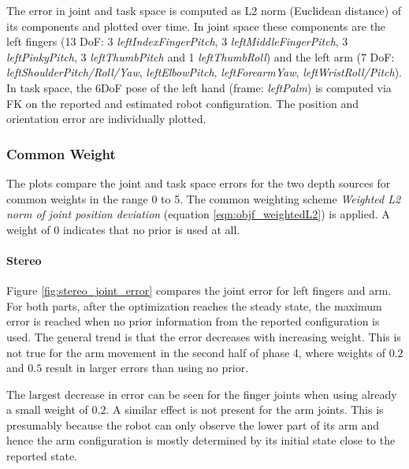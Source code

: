 The error in joint and task space is computed as L2 norm (Euclidean distance) of its components and plotted over time. In joint space these components are the left fingers (13 DoF: 3 \emph{leftIndexFingerPitch}, 3 \emph{leftMiddleFingerPitch}, 3 \emph{leftPinkyPitch}, 3 \emph{leftThumbPitch} and 1 \emph{leftThumbRoll}) and the left arm (7 DoF: \emph{leftShoulderPitch/Roll/Yaw}, \emph{leftElbowPitch}, \emph{leftForearmYaw}, \emph{leftWristRoll/Pitch}). In task space, the 6DoF pose of the left hand (frame: \emph{leftPalm}) is computed via FK on the reported and estimated robot configuration. The position and orientation error are individually plotted.

\subsubsection{Common Weight}

The plots compare the joint and task space errors for the two depth sources for common weights in the range 0 to 5. The common weighting scheme \emph{Weighted L2 norm of joint position deviation} (equation \ref{eqn:objf_weightedL2}) is applied. A weight of 0 indicates that no prior is used at all.

\paragraph{Stereo}

Figure \ref{fig:stereo_joint_error} compares the joint error for left fingers and arm. For both parts, after the optimization reaches the steady state, the maximum error is reached when no prior information from the reported configuration is used.
The general trend is that the error decreases with increasing weight. This is not true for the arm movement in the second half of phase 4, where weights of $0.2$ and $0.5$ result in larger errors than using no prior.

The largest decrease in error can be seen for the finger joints when using already a small weight of $0.2$. A similar effect is not present for the arm joints. This is presumably because the robot can only observe the lower part of its arm and hence the arm configuration is mostly determined by its initial state close to the reported state.


